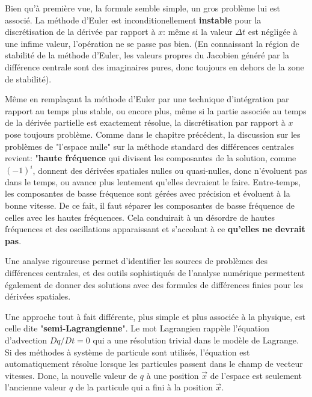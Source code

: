 \documentclass[11pt]{report}
\begin{document}
Bien qu'à première vue, la formule semble simple, un gros problème lui est associé. La méthode d'Euler est inconditionellement \textbf{instable} pour la discrétisation de la dérivée par rapport à $x$: même si la valeur $ \Delta t $ est négligée à une infime valeur, l'opération ne se passe pas bien. (En connaissant la région de stabilité de la méthode d'Euler, les valeurs propres du Jacobien généré par la différence centrale sont des imaginaires pures, donc toujours en dehors de la zone de stabilité).\newline

Même en remplaçant la méthode d'Euler par une technique d'intégration par rapport au temps plus stable, ou encore plus, même si la partie associée au temps de la dérivée partielle est exactement résolue, la discrétisation par rapport à $x$ pose toujours problème. Comme dans le chapitre précédent, la discussion sur les problèmes de "l'espace nulle" sur la méthode standard des différences centrales revient: "\textbf{haute fréquence} qui divisent les composantes de la solution, comme $(-1)^i$, donnent des dérivées spatiales nulles ou quasi-nulles, donc n'évoluent pas dans le temps, ou avance plus lentement qu'elles devraient le faire. Entre-temps, les composantes de basse fréquence sont gérées avec précision et évoluent à la bonne vitesse. De ce fait, il faut séparer les composantes de basse fréquence de celles avec les hautes fréquences. Cela conduirait à un désordre de hautes fréquences et des oscillations apparaissant et s'accolant à ce \textbf{qu'elles ne devrait pas}.\newline

Une analyse rigoureuse permet d'identifier les sources de problèmes des différences centrales, et des outils sophistiqués de l'analyse numérique permettent également de donner des solutions avec des formules de différences finies pour les dérivées spatiales.

Une approche tout à fait différente, plus simple et plus associée à la physique, est celle dite "\textbf{semi-Lagrangienne}". Le mot Lagrangien rappèle l'équation d'advection $ Dq/Dt = 0 $ qui a une résolution trivial dans le modèle de Lagrange. Si des méthodes à système de particule sont utilisés, l'équation est automatiquement résolue lorsque les particules passent dans le champ de vecteur vitesses. Donc, la nouvelle valeur de $q$ à une position $\overrightarrow{x}$ de l'espace est seulement l'ancienne valeur $q$  de la particule qui a fini à la position $\overrightarrow{x}$. \newline
\end{document}
